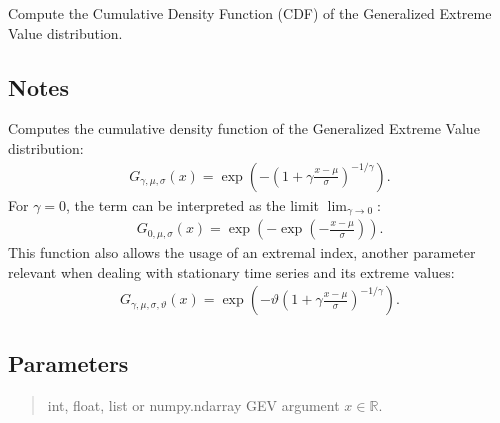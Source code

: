 \documentclass[a4paper,11pt,openany,english]{sphinxmanual}
\begin{document}
\begin{fulllineitems}
\label{\detokenize{api_misc:xtremes.miscellaneous.GEV_cdf}}
\pysigstartsignatures
{}
\pysigstopsignatures
\sphinxAtStartPar
Compute the Cumulative Density Function (CDF) of the Generalized Extreme Value distribution.


\subsection{Notes}
\label{\detokenize{api_misc:id13}}
\sphinxAtStartPar
Computes the cumulative density function of the Generalized Extreme Value distribution:
\begin{equation*}
\begin{split}G_{\gamma,\mu,\sigma}(x) = \exp\left(-\left(1+\gamma \frac{x-\mu}{\sigma}\right)^{-1/\gamma}\right).\end{split}
\end{equation*}
\sphinxAtStartPar
For \(\gamma=0\), the term can be interpreted as the limit \(\lim_{\gamma\to 0}\):
\begin{equation*}
\begin{split}G_{0,\mu,\sigma}(x) = \exp\left(-\exp\left(-\frac{x-\mu}{\sigma}\right)\right).\end{split}
\end{equation*}
\sphinxAtStartPar
This function also allows the usage of an extremal index, another parameter relevant when
dealing with stationary time series and its extreme values:
\begin{equation*}
\begin{split}G_{\gamma,\mu,\sigma,\vartheta}(x) = \exp\left(-\vartheta\left(1+\gamma \frac{x-\mu}{\sigma}\right)^{-1/\gamma}\right).\end{split}
\end{equation*}

\subsection{Parameters}
\label{\detokenize{api_misc:id14}}\begin{quote}\begin{description}
\sphinxAtStartPar
int, float, list or numpy.ndarray
GEV argument \(x\in \mathbb{R}\).


\end{description}
\end{quote}
\end{fulllineitems}
\end{document}
